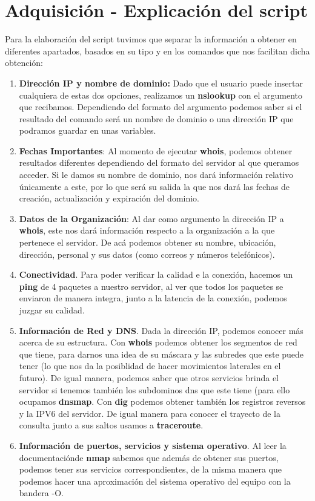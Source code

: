 \section{Adquisición - Explicación del script}

Para la elaboración del script tuvimos que separar la información a obtener en diferentes apartados, basados en su tipo y en los comandos que nos facilitan dicha obtención:

\begin{enumerate}
    \item \textbf{Dirección IP y nombre de dominio:} Dado que el usuario puede insertar cualquiera de estas dos opciones, realizamos un \textbf{nslookup} con el argumento que recibamos. Dependiendo del formato del argumento podemos saber si el resultado del comando será un nombre de dominio o una dirección IP que podramos guardar en unas variables.

    \item \textbf{Fechas Importantes}: Al momento de ejecutar \textbf{whois}, podemos obtener resultados diferentes dependiendo del formato del servidor al que queramos acceder. Si le damos su nombre de dominio, nos dará información relativo únicamente a este, por lo que será su salida la que nos dará las fechas de creación, actualización y expiración del dominio.
    \item \textbf{Datos de la Organización}: Al dar como argumento la dirección IP a \textbf{whois}, este nos dará información respecto a la organización a la que pertenece el servidor. De acá podemos obtener su nombre, ubicación, dirección, personal y sus datos (como correos y números telefónicos).
    \item \textbf{Conectividad}. Para poder verificar la calidad e la conexión, hacemos un \textbf{ping} de 4 paquetes a nuestro servidor, al ver que todos los paquetes se enviaron de manera integra, junto a la latencia de la conexión, podemos juzgar su calidad.
    \item \textbf{Información de Red y DNS}.
    Dada la dirección IP, podemos conocer más acerca de su estructura. Con \textbf{whois} podemos obtener los segmentos de red que tiene, para darnos una idea de su máscara y las subredes que este puede tener (lo que nos da la posiblidad de hacer movimientos laterales en el futuro). De igual manera, podemos saber que otros servicios brinda el servidor si tenemos también los subdominos dns que este tiene (para ello ocupamos \textbf{dnsmap}. Con \textbf{dig} podemos obtener también los registros reversos y la IPV6 del servidor.
    De igual manera para conocer el trayecto de la consulta junto a sus saltos usamos a \textbf{traceroute}.

    \item \textbf{Información de puertos, servicios y sistema operativo}. Al leer la documentaciónde \textbf{nmap} sabemos que además de obtener sus puertos, podemos tener sus servicios correspondientes, de la misma manera que podemos hacer una aproximación del sistema operativo del equipo con la bandera -O.
\end{enumerate}
